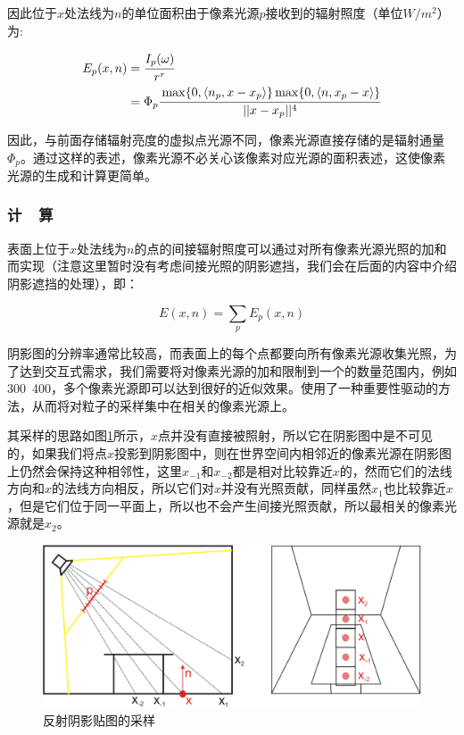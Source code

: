 因此位于$x$处法线为$n$的单位面积由于像素光源$p$接收到的辐射照度（单位$W/m^{2}$）为:

\begin{equation}
\begin{aligned}
	E_p(x,n)&= \cfrac{I_p(\omega)}{r^{r}} \\
			&=\Phi_p \cfrac{\max\{0,\langle n_p,x-x_p \rangle\}\max\{0,\langle n,x_p-x \rangle \}}{||x-x_p||^{4}}
\end{aligned}
\end{equation}

因此，与前面存储辐射亮度的虚拟点光源不同，像素光源直接存储的是辐射通量$\Phi_p$。通过这样的表述，像素光源不必关心该像素对应光源的面积表述，这使像素光源的生成和计算更简单。




\subsubsection{计~~算}\label{sec:ir-rsm-sampling}
表面上位于$x$处法线为$n$的点的间接辐射照度可以通过对所有像素光源光照的加和而实现（注意这里暂时没有考虑间接光照的阴影遮挡，我们会在后面的内容中介绍阴影遮挡的处理），即：

\begin{equation}
	E(x,n)=\sum_{p}E_p(x,n)
\end{equation}

阴影图的分辨率通常比较高，而表面上的每个点都要向所有像素光源收集光照，为了达到交互式需求，我们需要将对像素光源的加和限制到一个的数量范围内，例如300~400，多个像素光源即可以达到很好的近似效果。\cite{a:ReflectiveShadowMaps}使用了一种重要性驱动的方法，从而将对粒子的采样集中在相关的像素光源上。

其采样的思路如图\ref{f:ir-rsm-sampling}所示，$x$点并没有直接被照射，所以它在阴影图中是不可见的，如果我们将点$x$投影到阴影图中，则在世界空间内相邻近的像素光源在阴影图上仍然会保持这种相邻性，这里$x_{-1}$和$x_{-2}$都是相对比较靠近$x$的，然而它们的法线方向和$x$的法线方向相反，所以它们对$x$并没有光照贡献，同样虽然$x_1$也比较靠近$x$，但是它们位于同一平面上，所以也不会产生间接光照贡献，所以最相关的像素光源就是$x_2$。

\begin{figure}
\sidecaption
	\includegraphics[width=.65\textwidth]{figures/ir/ir-2-2}	
	\caption{反射阴影贴图的采样}
	\label{f:ir-rsm-sampling}
\end{figure}

